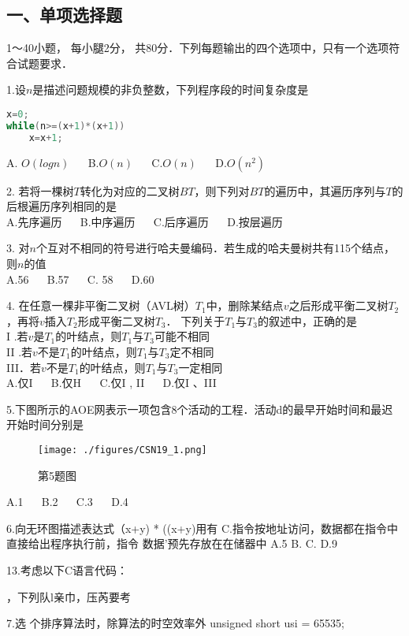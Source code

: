 
\subsection{一、单项选择题}
1～40小题， 每小腿2分， 共80分．下列每题输出的四个选项中，只有一个选项符合试题要求．

1.设$n$是描述问题规模的非负整数，下列程序段的时间复杂度是
\begin{lstlisting}[language=cpp]
x=0;
while(n>=(x+1)*(x+1))
    x=x+1;
\end{lstlisting}
A. $O(logn)$  $\quad$  B.$O(n)$  $\quad$   C.$O(n)$  $\quad$  D.$O(n^2)$

2. 若将一棵树$T$转化为对应的二叉树$BT$，则下列对$BT$的遍历中，其遍历序列与$T$的后根遍历序列相同的是 \\
A.先序遍历  $\quad$  B.中序遍历  $\quad$  C.后序遍历  $\quad$ D.按层遍历

3. 对$n$个互对不相同的符号进行哈夫曼编码．若生成的哈夫曼树共有115个结点，则$n$的值 \\
A.56  $\quad$  B.57  $\quad$  C. 58  $\quad$  D.60

4. 在任意一棵非平衡二叉树（AVL树）$T_1$中，删除某结点$v$之后形成平衡二叉树$T_2$，再将$v$插入$T_2$形成平衡二叉树$T_3$． 下列关于$T_1$与$T_3$的叙述中，正确的是 \\
I .若$v$是$T_1$的叶结点，则$T_1$与$T_3$可能不相同 \\
II .若$v$不是$T_1$的叶结点，则$T_1$与$T_3$定不相同  \\
III．若$v$不是$T_1$的叶结点，则$T_1$与$T_3$一定相同 \\
A.仅I  $\quad$  B.仅H  $\quad$ C.仅I , II  $\quad$  D.仅I 、III

5.下图所示的AOE网表示一项包含8个活动的工程．活动d的最早开始时间和最迟开始时间分别是
\begin{figure}[ht]
\centering
\texttt{[image: ./figures/CSN19\_1.png]}
\caption{第5题图} \label{CSN19_fig1}
\end{figure}
A.1  $\quad$  B.2  $\quad$  C.3  $\quad$  D.4

6.向无环图描述表达式（x+y) * ((x+y)用有    C.指令按地址访问，数据都在指令中直接给出程序执行前，指令   数据'预先存放在在储器中
   A.5    B.      C.      D.9

    13.考虑以下C语言代码：

    ，下列队l亲巾，压芮要考

7.选   个排序算法时，除算法的时空效率外    unsigned short usi = 65535;

